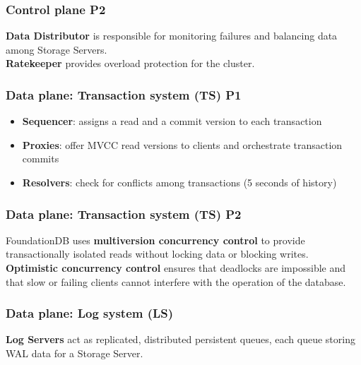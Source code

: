 

\begin{frame}
    \frametitle{Control plane P2}
    

\textbf{Data Distributor} is responsible for monitoring failures and balancing data among Storage Servers.\\
\textbf{Ratekeeper} provides overload protection for the cluster.
	
\end{frame}


\begin{frame}
	\frametitle{Data plane: Transaction system (TS) P1}
 
\begin{itemize}
    \item \textbf{Sequencer}: assigns a read and a commit version to each transaction
    \item \textbf{Proxies}: offer MVCC read versions to clients and orchestrate transaction commits
    \item \textbf{Resolvers}: check for conflicts among transactions (5 seconds of history)
\end{itemize}
	
\end{frame}


\begin{frame}
	\frametitle{Data plane: Transaction system (TS) P2}

FoundationDB uses \textbf{multiversion concurrency control} to provide transactionally isolated reads without locking data or blocking writes.\\
\textbf{Optimistic concurrency control} ensures that deadlocks are impossible and that slow or failing clients cannot interfere with the operation of the database.
	
\end{frame}



\begin{frame}
	\frametitle{Data plane: Log system (LS)}

\textbf{Log Servers} act as replicated, distributed persistent queues, each queue storing WAL data for a Storage Server.
	
\end{frame}

